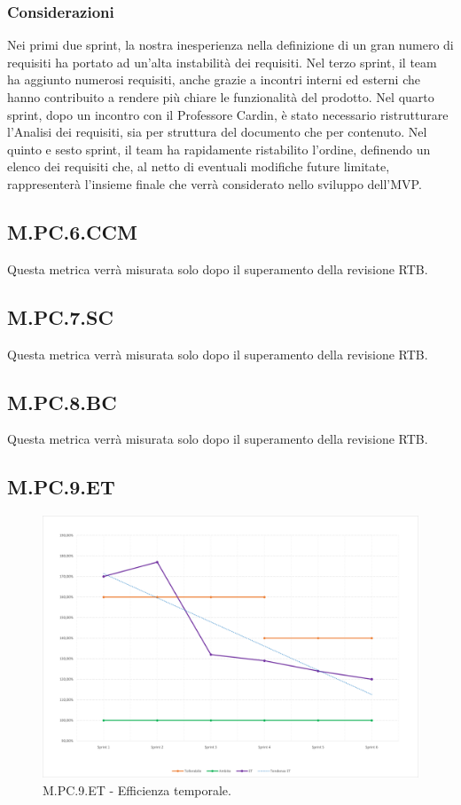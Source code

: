 \subsubsection{Considerazioni}
Nei primi due sprint, la nostra inesperienza nella definizione di un gran numero di requisiti ha portato ad un'alta instabilità dei requisiti.
Nel terzo sprint, il team ha aggiunto numerosi requisiti, anche grazie a incontri interni ed esterni che hanno contribuito a rendere più chiare le funzionalità del prodotto.
Nel quarto sprint, dopo un incontro con il Professore Cardin, è stato necessario ristrutturare l'Analisi dei requisiti, sia per struttura del documento che per contenuto.
Nel quinto e sesto sprint, il team ha rapidamente ristabilito l'ordine, definendo un elenco dei requisiti che, al netto di eventuali modifiche future limitate, rappresenterà l'insieme finale che verrà considerato nello sviluppo dell'MVP.
\subsection{M.PC.6.CCM}
Questa metrica verrà misurata solo dopo il superamento della revisione RTB.
\subsection{M.PC.7.SC}
Questa metrica verrà misurata solo dopo il superamento della revisione RTB.
\subsection{M.PC.8.BC}
Questa metrica verrà misurata solo dopo il superamento della revisione RTB.
\subsection{M.PC.9.ET}
\begin{figure}[H]
\includegraphics[width=15.5cm]{img/metriche/MPC9ET.png}
\caption{M.PC.9.ET - Efficienza temporale.}
\end{figure}

